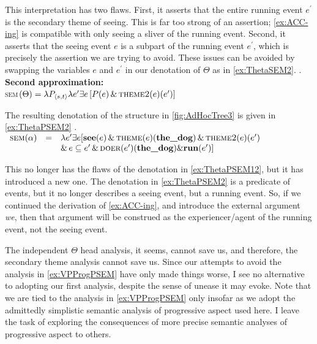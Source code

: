 This interpretation has two flaws.
First, it asserts that the entire running event $e^{\prime}$ is the secondary theme of seeing.
This is far too strong of an assertion; \cref{ex:ACC-ing} is compatible with only seeing a sliver of the running event.
Second, it asserts that the seeing event $e$ is a subpart of the running event $e^{\prime}$, which is precisely the assertion we are trying to avoid.
These issues can be avoided by swapping the variables $e$ and $e^{\prime}$ in our denotation of $\Theta$ as in \cref{ex:ThetaSEM2}.
\ex. \textbf{Second approximation:}\\ \textsc{sem}$(\Theta) = \lambda P_{\langle s,t\rangle} \lambda e^{\prime} \exists e\left[ P(e)\,\&\,\textsc{theme2}(e)(e^{\prime}) \right]$\label{ex:ThetaSEM2}

The resulting denotation of the structure in \cref{fig:AdHocTree3} is given in \cref{ex:ThetaPSEM2}
\ex.\label{ex:ThetaPSEM2} 
$
\begin{array}[t]{rcl}
	\textsc{sem}(\alpha) & = & \lambda e^{\prime} \exists e [ \textbf{see}(e)\,\&\,\textsc{theme}(e)(\textbf{the\_dog})\,\&\,\textsc{theme2}(e)(e^{\prime})\\
		& & \&\,e\subseteq e^{\prime} \,\&\, \textsc{doer}(e^{\prime})(\textbf{the\_dog}) \& \textbf{run}(e^{\prime})]
\end{array}
$

This no longer has the flaws of the denotation in \cref{ex:ThetaPSEM12}, but it has introduced a new one.
The denotation in \cref{ex:ThetaPSEM2} is a predicate of events, but it no longer describes a seeing event, but a running event.
So, if we continued the derivation of \cref{ex:ACC-ing}, and introduce the external argument \textit{we}, then that argument will be construed as the experiencer/agent of the running event, not the seeing event.

The independent $\Theta$ head analysis, it seems, cannot save us, and therefore, the secondary theme analysis cannot save us.
Since our attempts to avoid the analysis in \cref{ex:VPProgPSEM} have only made things worse, I see no alternative to adopting our first analysis, despite the sense of unease it may evoke.
Note that we are tied to the analysis in \cref{ex:VPProgPSEM} only insofar as we adopt the admittedly simplistic semantic analysis of progressive aspect used here.
I leave the task of exploring the consequences of more precise semantic analyses of progressive aspect to others.

